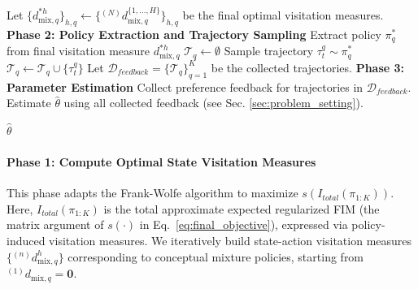 \documentclass{article}
\begin{document}
\begin{algorithm}[p]
\begin{algorithmic}
        \ENDFOR
    \ENDFOR
    \STATE Let $\{d^{*h}_{\text{mix},q}\}_{h,q} \leftarrow \{{}^{(N)}d_{\text{mix},q}^{\{1,\ldots,H\}}\}_{h,q}$ be the final optimal visitation measures.
\smallskip
\STATE \textbf{Phase 2: Policy Extraction and Trajectory Sampling}
\smallskip
        \STATE Extract policy $\pi^*_q$ from final visitation measure $d^{*h}_{\text{mix},q}$
        \STATE $\mathcal{T}_q \leftarrow \emptyset$ 
    \ENDFOR
            \STATE Sample trajectory $\tau_t^q \sim \pi^*_q$
            \STATE $\mathcal{T}_q \leftarrow \mathcal{T}_q \cup \{\tau_t^q\}$
        \ENDFOR
    \ENDFOR
    \STATE Let $\mathcal{D}_{feedback} = \{\mathcal{T}_q\}_{q=1}^K$ be the collected trajectories.
\smallskip
\STATE \textbf{Phase 3: Parameter Estimation}
\smallskip
    \STATE Collect preference feedback for trajectories in $\mathcal{D}_{feedback}$.
    \STATE Estimate $\hat{\theta}$ using all collected feedback (see Sec. \ref{sec:problem_setting}).

 $\hat{\theta}$
\end{algorithmic}
\end{algorithm}

\paragraph{Phase 1: Compute Optimal State Visitation Measures} This phase adapts the Frank-Wolfe algorithm \cite{frank1956algorithm} to maximize $s(I_{total}(\pi_{1:K}))$. Here, $I_{total}(\pi_{1:K})$ is the total approximate expected regularized FIM (the matrix argument of $s(\cdot)$ in Eq.~\ref{eq:final_objective}), expressed via policy-induced visitation measures. We iteratively build state-action visitation measures $\{ {}^{(n)}d^h_{\text{mix},q} \}$ corresponding to conceptual mixture policies, starting from ${}^{(1)}d_{\text{mix},q} = \mathbf{0}$.
\end{document}
